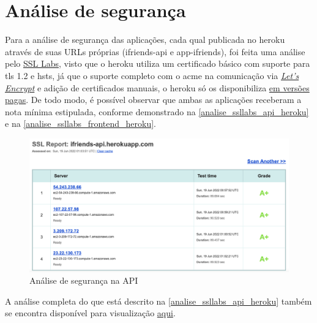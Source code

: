 \section{Análise de segurança}
Para a análise de segurança das aplicações, cada qual publicada no \gls{heroku} através de suas URLs próprias (ifriends-api e app-ifriends), foi feita uma análise pelo \href{https://www.ssllabs.com/}{SSL Labs}, visto que o \gls{heroku} utiliza um certificado básico com suporte para \acs{tls} 1.2 e \acs{hsts}, já que o suporte completo com o \acs{acme} na comunicação via \href{https://letsencrypt.org/getting-started/}{\textsl{Let's Encrypt}} e adição de certificados manuais, o \gls{heroku} só os disponibiliza \href{https://devcenter.heroku.com/articles/ssl}{ em versões pagas}. De todo modo, é possível observar que ambas as aplicações receberam a nota mínima estipulada, conforme demonstrado na \autoref{analise_ssllabs_api_heroku} e na \autoref{analise_ssllabs_frontend_heroku}.

\begin{figure}[htb]
\centering
\caption{\label{analise_ssllabs_api_heroku} Análise de segurança na API}
\includegraphics[width=1\textwidth]{anexos/Imagens_Seguranca/analise_ssllabs_api_heroku.png}
\end{figure}
\FloatBarrier

A análise completa do que está descrito na \autoref{analise_ssllabs_api_heroku} também se encontra disponível para visualização \href{https://www.ssllabs.com/ssltest/analyze.html?d=app-ifriends.herokuapp.com}{aqui}.

